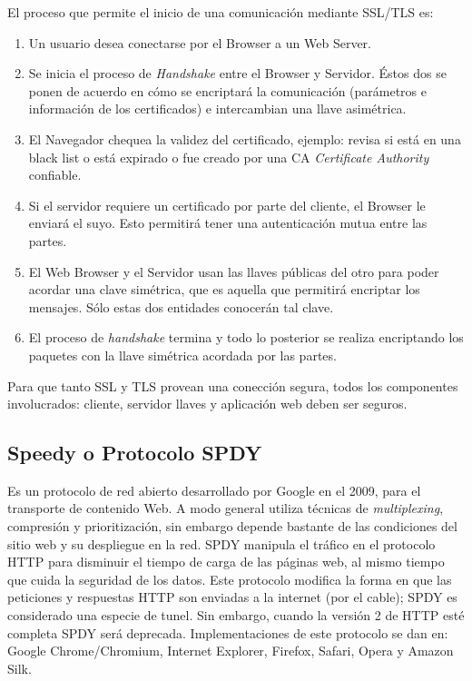     El proceso que permite el inicio de una comunicación mediante SSL/TLS es:
    \begin{enumerate}
        \item Un usuario desea conectarse por el Browser a un Web Server.
        \item Se inicia el proceso de \textit{Handshake} entre el Browser y Servidor. Éstos dos se ponen de acuerdo en cómo se encriptará la comunicación (parámetros e información de los certificados) e intercambian una llave asimétrica.
        \item El Navegador chequea la validez del certificado, ejemplo: revisa si está en una black list o está expirado o fue creado por una CA \textit{Certificate Authority} confiable.
        \item Si el servidor requiere un certificado por parte del cliente, el Browser le enviará el suyo. Esto permitirá tener una autenticación mutua entre las partes.
        \item El Web Browser y el Servidor usan las llaves públicas del otro para poder acordar una clave simétrica, que es aquella que permitirá encriptar los mensajes. Sólo estas dos entidades conocerán tal clave.
        \item El proceso de \textit{handshake} termina y todo lo posterior se realiza encriptando los paquetes con la llave simétrica acordada por las partes.
    \end{enumerate}

    Para que tanto SSL y TLS provean una conección segura, todos los componentes involucrados: cliente, servidor llaves y aplicación web deben ser seguros.

    \subsection{Speedy o Protocolo SPDY}
    \label{chap2:spdy}
    Es un protocolo de red abierto desarrollado por Google en el 2009, para el transporte de contenido Web. A modo general utiliza técnicas de \textit{multiplexing}, compresión y prioritización, sin embargo depende bastante de las condiciones del sitio web y su despliegue en la red. SPDY manipula el tráfico en el protocolo HTTP para disminuir el tiempo de carga de las páginas web, al mismo tiempo que cuida la seguridad de los datos. Este protocolo modifica la forma en que las peticiones y respuestas HTTP son enviadas a la internet (por el cable); SPDY es considerado una especie de tunel. Sin embargo, cuando la versión 2 de HTTP esté completa SPDY será deprecada. Implementaciones de este protocolo se dan en: Google Chrome/Chromium, Internet Explorer, Firefox, Safari, Opera y Amazon Silk.
    

